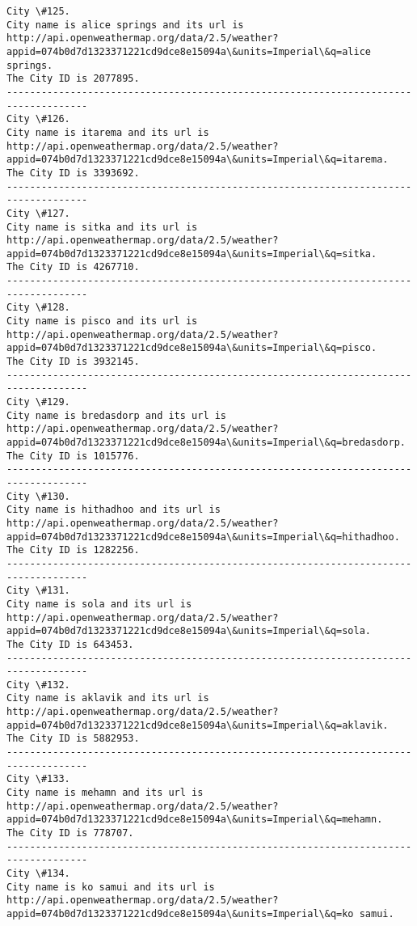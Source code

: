 \documentclass[11pt]{article}
\begin{document}
\begin{Verbatim}[commandchars=\\\{\}]
City \#125.
City name is alice springs and its url is http://api.openweathermap.org/data/2.5/weather?appid=074b0d7d1323371221cd9dce8e15094a\&units=Imperial\&q=alice springs.
The City ID is 2077895.
------------------------------------------------------------------------------------
City \#126.
City name is itarema and its url is http://api.openweathermap.org/data/2.5/weather?appid=074b0d7d1323371221cd9dce8e15094a\&units=Imperial\&q=itarema.
The City ID is 3393692.
------------------------------------------------------------------------------------
City \#127.
City name is sitka and its url is http://api.openweathermap.org/data/2.5/weather?appid=074b0d7d1323371221cd9dce8e15094a\&units=Imperial\&q=sitka.
The City ID is 4267710.
------------------------------------------------------------------------------------
City \#128.
City name is pisco and its url is http://api.openweathermap.org/data/2.5/weather?appid=074b0d7d1323371221cd9dce8e15094a\&units=Imperial\&q=pisco.
The City ID is 3932145.
------------------------------------------------------------------------------------
City \#129.
City name is bredasdorp and its url is http://api.openweathermap.org/data/2.5/weather?appid=074b0d7d1323371221cd9dce8e15094a\&units=Imperial\&q=bredasdorp.
The City ID is 1015776.
------------------------------------------------------------------------------------
City \#130.
City name is hithadhoo and its url is http://api.openweathermap.org/data/2.5/weather?appid=074b0d7d1323371221cd9dce8e15094a\&units=Imperial\&q=hithadhoo.
The City ID is 1282256.
------------------------------------------------------------------------------------
City \#131.
City name is sola and its url is http://api.openweathermap.org/data/2.5/weather?appid=074b0d7d1323371221cd9dce8e15094a\&units=Imperial\&q=sola.
The City ID is 643453.
------------------------------------------------------------------------------------
City \#132.
City name is aklavik and its url is http://api.openweathermap.org/data/2.5/weather?appid=074b0d7d1323371221cd9dce8e15094a\&units=Imperial\&q=aklavik.
The City ID is 5882953.
------------------------------------------------------------------------------------
City \#133.
City name is mehamn and its url is http://api.openweathermap.org/data/2.5/weather?appid=074b0d7d1323371221cd9dce8e15094a\&units=Imperial\&q=mehamn.
The City ID is 778707.
------------------------------------------------------------------------------------
City \#134.
City name is ko samui and its url is http://api.openweathermap.org/data/2.5/weather?appid=074b0d7d1323371221cd9dce8e15094a\&units=Imperial\&q=ko samui.

\end{Verbatim}
\end{document}
